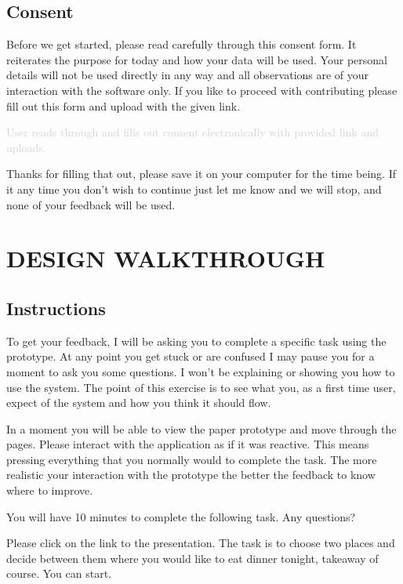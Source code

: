 \documentclass[a4 paper, 12pt]{article}
\begin{document}
    \subsection*{Consent}
        \begin{itshape}
            Before we get started, please read carefully through this consent form. It reiterates the purpose for today and how your data will be used. Your personal details will not be used directly in any way and all observations are of your interaction with the software only. If you like to proceed with contributing please fill out this form and upload with the given link.
        \end{itshape}

        \textcolor{lightgray}
            {User reads through and fills out consent electronically with provided link and uploads.}
        
        \begin{itshape}
            Thanks for filling that out, please save it on your computer for the time being. If it any time you don’t wish to continue just let me know and we will stop, and none of your feedback will be used.
        \end{itshape}

\section*{DESIGN WALKTHROUGH}
    \subsection*{Instructions}

        \begin{itshape}
            To get your feedback, I will be asking you to complete a specific task using the prototype. At any point you get stuck or are confused I may pause you for a moment to ask you some questions. I won’t be explaining or showing you how to use the system. The point of this exercise is to see what you, as a first time user, expect of the system and how you think it should flow.

            In a moment you will be able to view the paper prototype and move through the pages. Please interact with the application as if it was reactive. This means pressing everything that you normally would to complete the task. The more realistic your interaction with the prototype the better the feedback to know where to improve. 

            You will have 10 minutes to complete the following task. Any questions? 

            Please click on the link to the presentation. The task is to choose two places and decide between them where you would like to eat dinner tonight, takeaway of course. You can start.
        \end{itshape}
\end{document}
